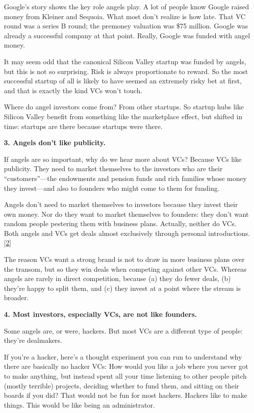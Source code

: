 Google's story shows the key role angels play. A lot of people know
Google raised money from Kleiner and Sequoia. What most don't realize is
how late. That VC round was a series B round; the premoney valuation was
\$75 million. Google was already a successful company at that point.
Really, Google was funded with angel money.

It may seem odd that the canonical Silicon Valley startup was funded by
angels, but this is not so surprising. Risk is always proportionate to
reward. So the most successful startup of all is likely to have seemed
an extremely risky bet at first, and that is exactly the kind VCs won't
touch.

Where do angel investors come from? From other startups. So startup hubs
like Silicon Valley benefit from something like the marketplace effect,
but shifted in time: startups are there because startups were there.

\textbf{3. Angels don't like publicity.}

If angels are so important, why do we hear more about VCs? Because VCs
like publicity. They need to market themselves to the investors who are
their ``customers''---the endowments and pension funds and rich families
whose money they invest---and also to founders who might come to them
for funding.

Angels don't need to market themselves to investors because they invest
their own money. Nor do they want to market themselves to founders: they
don't want random people pestering them with business plans. Actually,
neither do VCs. Both angels and VCs get deals almost exclusively through
personal introductions. {[}\hyperref[f2n]{2}{]}

The reason VCs want a strong brand is not to draw in more business plans
over the transom, but so they win deals when competing against other
VCs. Whereas angels are rarely in direct competition, because (a) they
do fewer deals, (b) they're happy to split them, and (c) they invest at
a point where the stream is broader.

\textbf{4. Most investors, especially VCs, are not like founders.}

Some angels are, or were, hackers. But most VCs are a different type of
people: they're dealmakers.

If you're a hacker, here's a thought experiment you can run to
understand why there are basically no hacker VCs: How would you like a
job where you never got to make anything, but instead spent all your
time listening to other people pitch (mostly terrible) projects,
deciding whether to fund them, and sitting on their boards if you did?
That would not be fun for most hackers. Hackers like to make things.
This would be like being an administrator.

